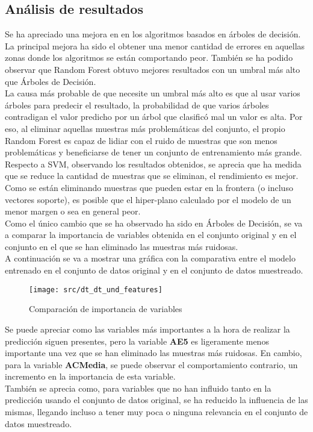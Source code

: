 \subsection{Análisis de resultados}
Se ha apreciado una mejora en en los algoritmos basados en árboles de decisión. La principal mejora ha sido el obtener una menor cantidad de errores en aquellas zonas donde los algoritmos se están comportando peor. También se ha podido observar que Random Forest obtuvo mejores resultados con un umbral más alto que Árboles de Decisión. \\
La causa más probable de que necesite un umbral más alto es que al usar varios árboles para predecir el resultado, la probabilidad de que varios árboles contradigan el valor predicho por un árbol que clasificó mal un valor es alta. Por eso, al eliminar aquellas muestras más problemáticas del conjunto, el propio Random Forest es capaz de lidiar con el ruido de muestras que son menos problemáticas y beneficiarse de tener un conjunto de entrenamiento más grande.\\
\linebreak
Respecto a SVM, observando los resultados obtenidos, se aprecia que ha medida que se reduce la cantidad de muestras que se eliminan, el rendimiento es mejor.
Como se están eliminando muestras que pueden estar en la frontera (o incluso vectores soporte), es posible que el hiper-plano calculado por el modelo de un menor margen o sea en general peor.\\
\linebreak
Como el único cambio que se ha observado ha sido en Árboles de Decisión, se va a comparar la importancia de variables obtenida en el conjunto original y en el conjunto en el que se han eliminado las muestras más ruidosas.\\
\linebreak
A continuación se va a mostrar una gráfica con la comparativa entre el modelo entrenado en el conjunto de datos original y en el conjunto de datos muestreado.
\clearpage
\begin{figure}[H]
	\centering
	\texttt{[image: src/dt\_dt\_und\_features]}
	\caption{Comparación de importancia de variables}
	\label{fig:cmp_fi_dt}
\end{figure}
Se puede apreciar como las variables más importantes a la hora de realizar la predicción siguen presentes, pero la variable \textbf{AE5} es ligeramente menos importante una vez que se han eliminado las muestras más ruidosas. En cambio, para la variable \textbf{ACMedia}, se puede observar el comportamiento contrario, un incremento en la importancia de esta variable. \\
\linebreak
También se aprecia como, para variables que no han influido tanto en la predicción usando el conjunto de datos original, se ha reducido la influencia de las mismas, llegando incluso a tener muy poca o ninguna relevancia en el conjunto de datos muestreado.
